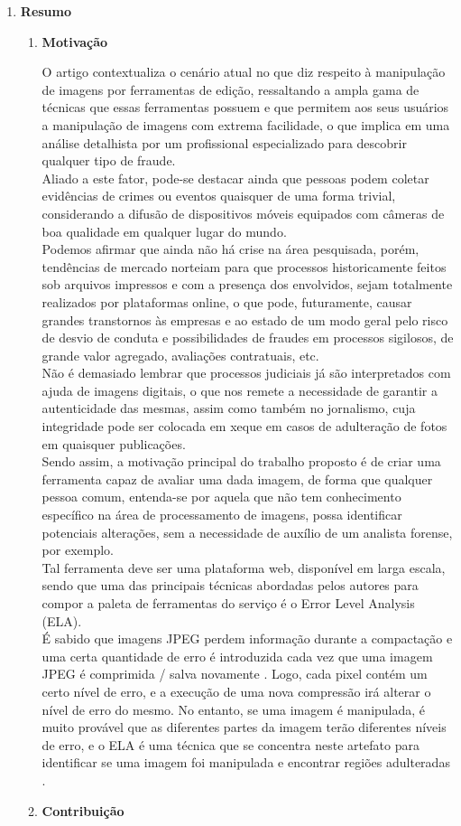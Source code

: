 \begin{enumerate}
  \item \textbf{Resumo}
    \begin{enumerate}[label*=\arabic*.]
      \item \textbf{Motivação}

O artigo contextualiza o cenário atual no que diz respeito à manipulação de imagens por ferramentas de edição, ressaltando a ampla gama de técnicas que essas ferramentas possuem e que permitem aos seus usuários a manipulação de imagens com extrema facilidade, o que implica em uma análise detalhista por um profissional especializado para descobrir qualquer tipo de fraude.
\\[6pt]
Aliado a este fator, pode-se destacar ainda que pessoas podem coletar evidências de crimes ou eventos quaisquer de uma forma trivial, considerando a difusão de dispositivos móveis equipados com câmeras de boa qualidade em qualquer lugar do mundo.
\\[6pt]
Podemos afirmar que ainda não há crise na área pesquisada, porém, tendências de mercado norteiam para que processos historicamente feitos sob arquivos impressos e com a presença dos envolvidos, sejam totalmente realizados por plataformas online, o que pode, futuramente, causar grandes transtornos às empresas e ao estado de um modo geral pelo risco de desvio de conduta e possibilidades de fraudes em processos sigilosos, de grande valor agregado, avaliações contratuais, etc.
\\[6pt]
Não é demasiado lembrar que processos judiciais já são interpretados com ajuda de imagens digitais, o que nos remete a necessidade de garantir a autenticidade das mesmas, assim como também no jornalismo, cuja integridade pode ser colocada em xeque em casos de adulteração de fotos em quaisquer publicações.
\\[6pt]
Sendo assim, a motivação principal do trabalho proposto é de criar uma ferramenta capaz de avaliar uma dada imagem, de forma que qualquer pessoa comum, entenda-se por aquela que não tem conhecimento específico na área de processamento de imagens, possa identificar potenciais alterações, sem a necessidade de auxílio de um analista forense, por exemplo.
\\[6pt]
Tal ferramenta deve ser uma plataforma web, disponível em larga escala, sendo que uma das principais técnicas abordadas pelos autores para compor a paleta de ferramentas do serviço é o Error Level Analysis (ELA).
\\[6pt]
É sabido que imagens JPEG perdem informação durante a compactação e uma certa quantidade de erro é introduzida cada vez que uma imagem JPEG é comprimida / salva novamente \cite{krawetz}. Logo, cada pixel contém um certo nível de erro, e a execução de uma nova compressão irá alterar o nível de erro do mesmo. No entanto, se uma imagem é manipulada, é muito provável que as diferentes partes da imagem terão diferentes níveis de erro, e o ELA é uma técnica que se concentra neste artefato para identificar se uma imagem foi manipulada e encontrar regiões adulteradas \cite{krawetz}.
\\[6pt]
\item \textbf{Contribuição}


\end{enumerate}
\end{enumerate}
